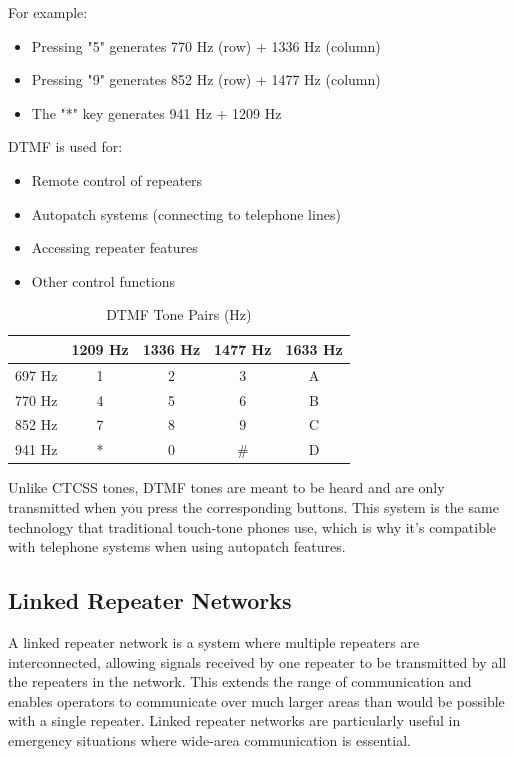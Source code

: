 For example:
\begin{itemize}
    \item Pressing "5" generates 770 Hz (row) + 1336 Hz (column)
    \item Pressing "9" generates 852 Hz (row) + 1477 Hz (column)
    \item The "*" key generates 941 Hz + 1209 Hz
\end{itemize}

DTMF is used for:
\begin{itemize}
    \item Remote control of repeaters
    \item Autopatch systems (connecting to telephone lines)
    \item Accessing repeater features
    \item Other control functions
\end{itemize}

\begin{table}[h]
    \centering
    \caption{DTMF Tone Pairs (Hz)}
    \begin{tabular}{|c||c|c|c|c|}
        \hline
        & 1209 Hz & 1336 Hz & 1477 Hz & 1633 Hz \\
        \hline
        697 Hz & 1 & 2 & 3 & A \\
        \hline
        770 Hz & 4 & 5 & 6 & B \\
        \hline
        852 Hz & 7 & 8 & 9 & C \\
        \hline
        941 Hz & * & 0 & \# & D \\
        \hline
    \end{tabular}
    \label{tab:dtmf_tones}
\end{table}

Unlike CTCSS tones, DTMF tones are meant to be heard and are only transmitted when you press the corresponding buttons. This system is the same technology that traditional touch-tone phones use, which is why it's compatible with telephone systems when using autopatch features.

\subsection*{Linked Repeater Networks}
A linked repeater network is a system where multiple repeaters are interconnected, allowing signals received by one repeater to be transmitted by all the repeaters in the network. This extends the range of communication and enables operators to communicate over much larger areas than would be possible with a single repeater. Linked repeater networks are particularly useful in emergency situations where wide-area communication is essential.


